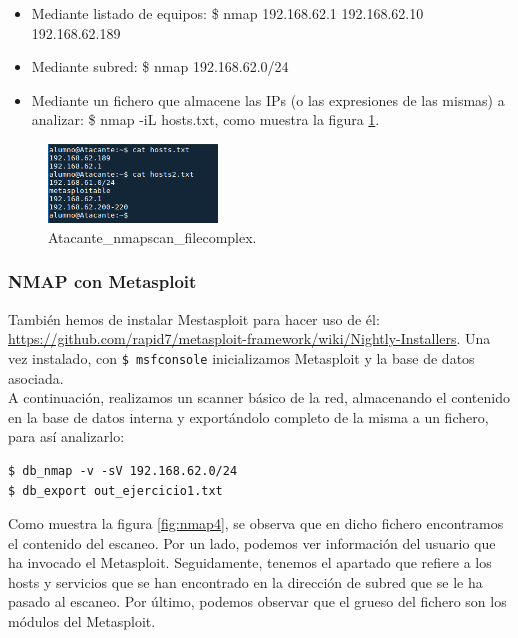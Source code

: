 \documentclass[a4,12pt,onecolum]{article}
\begin{document}
\begin{itemize}
  \item Mediante listado de equipos: \$ nmap 192.168.62.1 192.168.62.10 192.168.62.189
  \item Mediante subred: \$ nmap 192.168.62.0/24
  \item Mediante un fichero que almacene las IPs (o las expresiones de las mismas) a analizar: \$ nmap -iL hosts.txt, como muestra la figura \ref{fig:nmap3}.
\end{itemize}

\begin{figure}[htbp]
\centering
\includegraphics[width=0.4\textwidth]{./images/Atacante_nmapscan_filecomplex.png}
\caption{Atacante\_nmapscan\_filecomplex.}
\label{fig:nmap3}
\end{figure}

\subsubsection{NMAP con Metasploit}

También hemos de instalar Mestasploit para hacer uso de él: \url{https://github.com/rapid7/metasploit-framework/wiki/Nightly-Installers}. Una vez instalado, con \texttt{\$ msfconsole} inicializamos Metasploit y la base de datos asociada. \\

A continuación, realizamos un scanner básico de la red, almacenando el contenido en la base de datos interna y exportándolo completo de la misma a un fichero, para así analizarlo:

\begin{verbatim}
$ db_nmap -v -sV 192.168.62.0/24
$ db_export out_ejercicio1.txt
\end{verbatim}

Como muestra la figura \ref{fig:nmap4}, se observa que en dicho fichero encontramos el contenido del escaneo. Por un lado, podemos ver información del usuario que ha invocado el Metasploit. Seguidamente, tenemos el apartado que refiere a los hosts y servicios que se han encontrado en la dirección de subred que se le ha pasado al escaneo. Por último, podemos observar que el grueso del fichero son los módulos del Metasploit.
\end{document}
